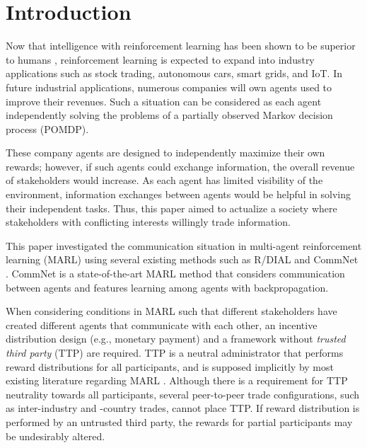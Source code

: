 \section{Introduction}

Now that intelligence with reinforcement learning has been shown to be superior to humans \citep{tesauro1995temporal,mnih2015human,silver2016mastering}, reinforcement learning is expected to expand into industry applications such as stock trading, autonomous cars, smart grids, and IoT. 
In future industrial applications, numerous companies will own agents used to improve their revenues.
Such a situation can be considered as each agent independently solving the problems of a partially observed Markov decision process (POMDP).

These company agents are designed to independently maximize their own rewards; 
however, if such agents could exchange information, the overall revenue of stakeholders would increase.
As each agent has limited visibility of the environment, information exchanges between agents would be helpful in solving their independent tasks.
Thus, this paper aimed to actualize a society where stakeholders with conflicting interests willingly trade information.

This paper investigated the communication situation in multi-agent reinforcement learning (MARL) using several existing methods such as R/DIAL \citep{foerster2016learning} and CommNet \citep{sukhbaatar2016learning}.
CommNet is a state-of-the-art MARL method that considers communication between agents 
and features learning among agents with backpropagation.

When considering conditions in MARL such that different stakeholders have created different agents that communicate with each other, an incentive distribution design (e.g., monetary payment) and a framework without {\em trusted third party} (TTP) are required.
TTP is a neutral administrator that performs reward distributions for all participants, and is supposed implicitly by most existing literature regarding MARL \citep{agogino2006quicr,foerster2016learning,sukhbaatar2016learning}.
Although there is a requirement for TTP neutrality towards all participants,
several peer-to-peer trade configurations, such as inter-industry and -country trades, cannot place TTP.
If reward distribution is performed by an untrusted third party, the rewards for partial participants may be undesirably altered.

